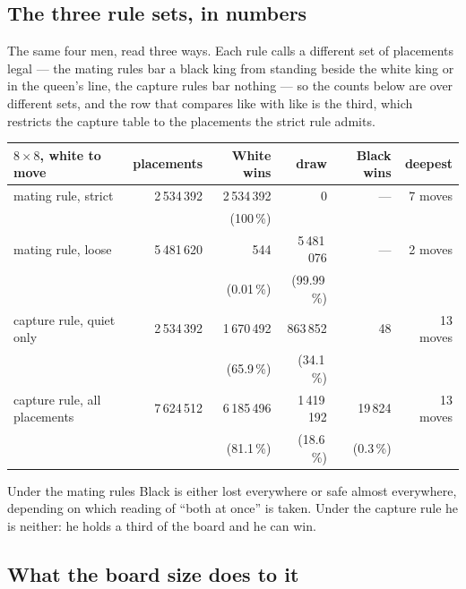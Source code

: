 \documentclass[11pt]{article}
\begin{document}
\subsection{The three rule sets, in numbers}\label{sub:cap-three}

The same four men, read three ways. Each rule calls a different set of
placements legal --- the mating rules bar a black king from standing beside the
white king or in the queen's line, the capture rules bar nothing --- so the
counts below are over different sets, and the row that compares like with like
is the third, which restricts the capture table to the placements the strict
rule admits.

\begin{center}\small
\begin{tabular}{@{}lrrrrr@{}}
\toprule
$8\times8$, white to move & placements & White wins & draw & Black wins & deepest \\
\midrule
mating rule, strict          & 2\,534\,392 & 2\,534\,392 & 0 & --- & 7 moves \\
                             &             & (100\,\%)   & & & \\
mating rule, loose           & 5\,481\,620 & 544 & 5\,481\,076 & --- & 2 moves \\
                             &             & (0.01\,\%) & (99.99\,\%) & & \\
capture rule, quiet only     & 2\,534\,392 & 1\,670\,492 & 863\,852 & 48 & 13 moves \\
                             &             & (65.9\,\%) & (34.1\,\%) & & \\
capture rule, all placements & 7\,624\,512 & 6\,185\,496 & 1\,419\,192 & 19\,824 & 13 moves \\
                             &             & (81.1\,\%) & (18.6\,\%) & (0.3\,\%) & \\
\bottomrule
\end{tabular}
\end{center}

\noindent
Under the mating rules Black is either lost everywhere or safe almost
everywhere, depending on which reading of ``both at once'' is taken. Under the
capture rule he is neither: he holds a third of the board and he can win.

\subsection{What the board size does to it}\label{sub:cap-boardsize}
\end{document}
